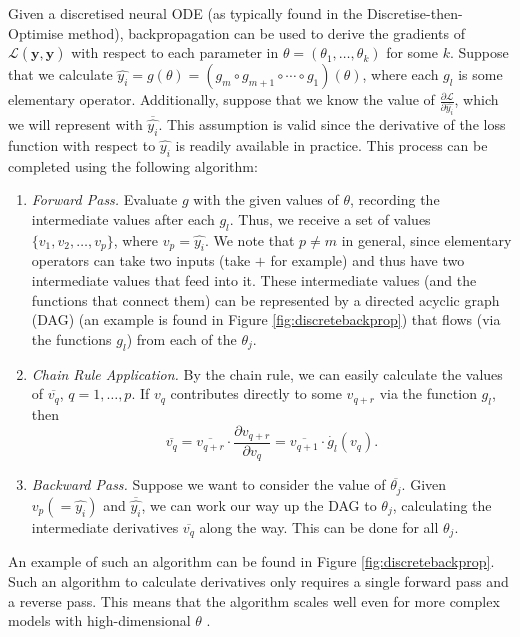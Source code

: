 \documentclass[a4paper,11pt,titlepage]{article}
\theoremstyle{definition}
\theoremstyle{plain}
\theoremstyle{remark}
\begin{document}
Given a discretised neural ODE (as typically found in the Discretise-then-Optimise method), backpropagation can be used to derive the gradients of $\mathcal{L}(\mathbf{y}, \mathbf{\hat{y}})$ with respect to each parameter in $\theta = (\theta_1, \dots, \theta_k)$ for some $k$. Suppose that we calculate $\hat{y_i} = g(\theta) = (g_m \circ g_{m+1} \circ \cdots \circ g_1) (\theta)$, where each $g_l$ is some elementary operator. Additionally, suppose that we know the value of $\frac{\partial \mathcal{L}}{\partial \hat{y_i}}$, which we will represent with $\overline{\hat{y_i}}$. This assumption is valid since the derivative of the loss function with respect to $\hat{y_i}$ is readily available in practice. This process can be completed using the following algorithm:
\begin{enumerate}
    \item \textit{Forward Pass.} Evaluate $g$ with the given values of $\theta$, recording the intermediate values after each $g_l$. Thus, we receive a set of values $\{v_1, v_2, \dots, v_p \}$, where $v_p = \hat{y_i}$. We note that $p \neq m$ in general, since elementary operators can take two inputs (take $+$ for example) and thus have two intermediate values that feed into it. These intermediate values (and the functions that connect them) can be represented by a directed acyclic graph (DAG) (an example is found in Figure \ref{fig:discretebackprop}) that flows (via the functions $g_l$) from each of the $\theta_j$.
    \item \textit{Chain Rule Application.} By the chain rule, we can easily calculate the values of $\overline{v_q}$, $q = 1, \dots, p$. If $v_q$ contributes directly to some $v_{q+r}$ via the function $g_l$, then
    $$
    \overline{v_q} = \overline{v_{q+r}} \cdot \frac{\partial v_{q+r}}{\partial v_q} = \overline{v_{q+1}} \cdot \dot{g_l}(v_q).
    $$
    \item \textit{Backward Pass.} Suppose we want to consider the value of $\overline{\theta_j}$. Given $v_p ( = \hat{y_i})$ and $\overline{\hat{y_i}}$, we can work our way up the DAG to $\theta_j$, calculating the intermediate derivatives $\overline{v_q}$ along the way. This can be done for all $\theta_j$.
\end{enumerate}

An example of such an algorithm can be found in Figure \ref{fig:discretebackprop}. Such an algorithm to calculate derivatives only requires a single forward pass and a reverse pass. This means that the algorithm scales well even for more complex models with high-dimensional $\theta$ \cite{ketkar2017}. 
\end{document}
